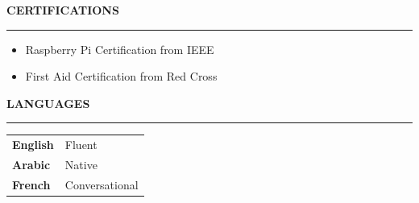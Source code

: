 \documentclass[11pt]{article}
\makeatletter
\newcommand{\cvsection}[1]{%
    \par\addvspace{14pt}%
    \Needspace{5\baselineskip}%
    {\large\bfseries #1\par}%
    \vspace{4pt}%
    \hrule
    \vspace{8pt}%
}
\newcommand{\cvheading}[2]{%
    \par
    \Needspace{4\baselineskip}%
    \noindent
    \begin{tabularx}{\linewidth}{%
        @{}
        >{\raggedright\arraybackslash}X
        >{\raggedleft\arraybackslash}p{1.65in}
        @{}
    }
        \textbf{#1} & #2
    \end{tabularx}\par
}
\newcommand{\cvplainentry}[3]{%
    \cvheading{#1}{#2}%
    \if\relax\detokenize{#3}\relax
    \else
        \smallskip
        #3\par
    \fi
    \addvspace{8pt}%
}
\makeatother
\begin{document}


\cvsection{CERTIFICATIONS}

\begin{itemize}
    \item Raspberry Pi Certification from IEEE
    \item First Aid Certification from Red Cross
\end{itemize}


\cvsection{LANGUAGES}

\begin{tabularx}{\linewidth}{%
    @{}
    >{\bfseries}l
    X
    @{}
}
    English & Fluent \\[4pt]
    Arabic & Native \\[4pt]
    French & Conversational
\end{tabularx}



\end{document}
